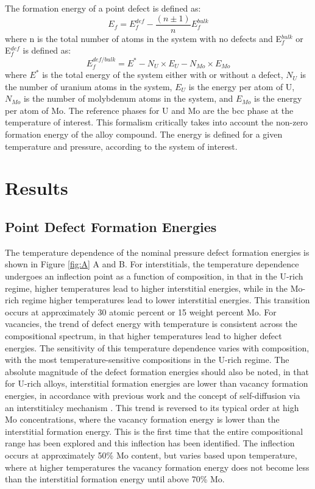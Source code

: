 \documentclass[default]{sn-jnl}%
\begin{document}
The formation energy of a point defect is defined as:
\begin{equation}
 E_f= E_f^{def} -  \frac{(n\pm1)}{n}E_f^{bulk}
\end{equation}
\noindent where n is the total number of atoms in the system with no defects and E$_f^{bulk}$ or E$_f^{def}$ is defined as:
\begin{equation}
E_f^{def/bulk}= E^*- N_U \times E_U - N_{Mo} \times E_{Mo} 
\end{equation}
\noindent where $E^*$ is the total energy of the system either with or without a defect, $N_U$ is the number of uranium atoms in the system, $E_U$ is the energy per atom of U, $N_{Mo}$ is the number of molybdenum atoms in the system, and $E_{Mo}$ is the energy per atom of Mo. The reference phases for U and Mo are the bcc phase at the temperature of interest. This formalism critically takes into account the non-zero formation energy of the alloy compound. The energy is defined for a given temperature and pressure, according to the system of interest. 

\section{Results}\label{sec3}
\subsection{Point Defect Formation Energies}
The temperature dependence of the nominal pressure defect formation energies is shown in Figure \ref{fig:A} A and B. For interstitials, the temperature dependence undergoes an inflection point as a function of composition, in that in the U-rich regime, higher temperatures lead to higher interstitial energies, while in the Mo-rich regime higher temperatures lead to lower interstitial energies. This transition occurs at approximately 30 atomic percent or 15 weight percent Mo. For vacancies, the trend of defect energy with temperature is consistent across the compositional spectrum, in that higher temperatures lead to higher defect energies. The sensitivity of this temperature dependence varies with composition, with the most temperature-sensitive compositions in the U-rich regime. The absolute magnitude of the defect formation energies should also be noted, in that for U-rich alloys, interstitial formation energies are lower than vacancy formation energies, in accordance with previous work \cite{beeler2010,beelerAIMD,smirnova2015,park2021} and the concept of self-diffusion via an interstitialcy mechanism \cite{park2021}. This trend is reversed to its typical order at high Mo concentrations, where the vacancy formation energy is lower than the interstitial formation energy. This is the first time that the entire compositional range has been explored and this inflection has been identified. The inflection occurs at approximately 50\% Mo content, but varies based upon temperature, where at higher temperatures the vacancy formation energy does not become less than the interstitial formation energy until above 70\% Mo. 
\end{document}
